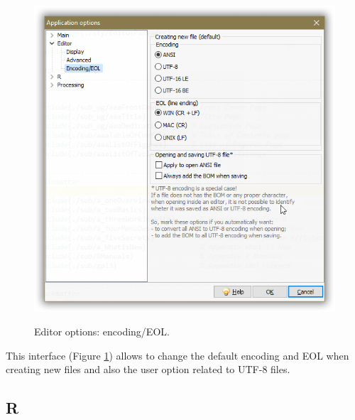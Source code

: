 \begin{figure}[H]
  \includegraphics[scale=0.50]{./res/app_editor_encoding.png}\\
  \caption{Editor options: encoding/EOL.}
  \label{fig:editor_encoding}
\end{figure}

This interface
(Figure \ref{fig:editor_encoding})
allows to change the default encoding and EOL when creating new files and
also the user option related to UTF-8 files.


\hypertarget{working_app_r}{}
\subsection{R}

